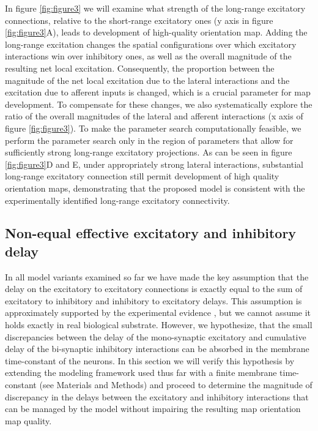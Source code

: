 \documentclass[utf8]{frontiersSCNS}
\begin{document}
In figure \ref{fig:figure3} we will examine what strength of the long-range excitatory connections, relative to the short-range excitatory ones (y axis in figure \ref{fig:figure3}A), leads to development of high-quality orientation map.
Adding the long-range excitation changes the spatial configurations over which excitatory interactions win over inhibitory ones, as well as the 
overall magnitude of the resulting net local excitation. Consequently, the proportion between the magnitude of the net local excitation due to the lateral interactions and the excitation
due to afferent inputs is changed, which is a crucial parameter for map development. To compensate for these changes, we also systematically explore the ratio of the overall magnitudes of the lateral and afferent 
interactions (x axis of figure \ref{fig:figure3}). To make the parameter search computationally feasible, we perform the parameter search only in the region of parameters that allow for sufficiently strong
long-range excitatory projections. As can be seen in figure \ref{fig:figure3}D and E, under appropriately strong lateral interactions, substantial long-range excitatory connection still permit development of high quality orientation maps, demonstrating that the proposed model is consistent with the experimentally identified long-range excitatory connectivity.



\subsection{Non-equal effective excitatory and inhibitory delay} \label{sec:SM4}

In all model variants examined so far we have made the key assumption that the delay on the excitatory to excitatory connections is exactly equal 
to the sum of excitatory to inhibitory and inhibitory to excitatory delays. This assumption is approximately supported by the experimental evidence 
\citep{Ohana2012}, but we cannot assume it holds exactly in real biological substrate.  However, we hypothesize, that the small discrepancies between the delay of the mono-synaptic excitatory and cumulative delay of the bi-synaptic inhibitory interactions can be absorbed in the membrane time-constant of the neurons. In this section we will verify this hypothesis by extending the modeling framework used thus far with a finite membrane time-constant (see Materials and Methods) and proceed to determine the magnitude of discrepancy in the delays between the excitatory and inhibitory interactions that can be managed by the model without impairing the resulting map orientation map quality. 
\end{document}
